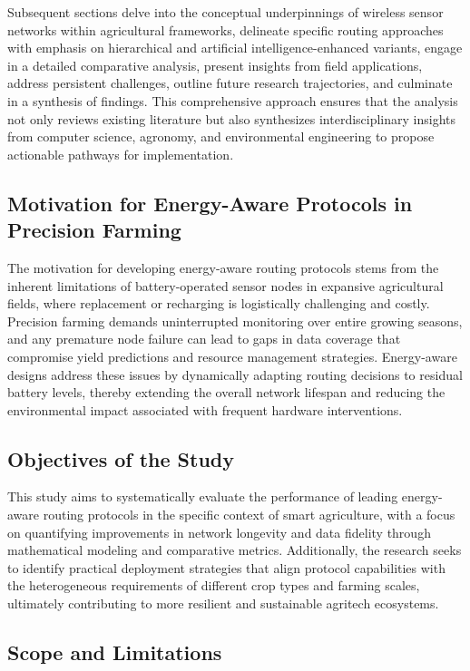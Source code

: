 \documentclass[12pt]{article}
\begin{document}
Subsequent sections delve into the conceptual underpinnings of wireless sensor networks within agricultural frameworks, delineate specific routing approaches with emphasis on hierarchical and artificial intelligence-enhanced variants, engage in a detailed comparative analysis, present insights from field applications, address persistent challenges, outline future research trajectories, and culminate in a synthesis of findings. This comprehensive approach ensures that the analysis not only reviews existing literature but also synthesizes interdisciplinary insights from computer science, agronomy, and environmental engineering to propose actionable pathways for implementation.

\subsection{Motivation for Energy-Aware Protocols in Precision Farming}

The motivation for developing energy-aware routing protocols stems from the inherent limitations of battery-operated sensor nodes in expansive agricultural fields, where replacement or recharging is logistically challenging and costly. Precision farming demands uninterrupted monitoring over entire growing seasons, and any premature node failure can lead to gaps in data coverage that compromise yield predictions and resource management strategies. Energy-aware designs address these issues by dynamically adapting routing decisions to residual battery levels, thereby extending the overall network lifespan and reducing the environmental impact associated with frequent hardware interventions.

\subsection{Objectives of the Study}

This study aims to systematically evaluate the performance of leading energy-aware routing protocols in the specific context of smart agriculture, with a focus on quantifying improvements in network longevity and data fidelity through mathematical modeling and comparative metrics. Additionally, the research seeks to identify practical deployment strategies that align protocol capabilities with the heterogeneous requirements of different crop types and farming scales, ultimately contributing to more resilient and sustainable agritech ecosystems.

\subsection{Scope and Limitations}
\end{document}
